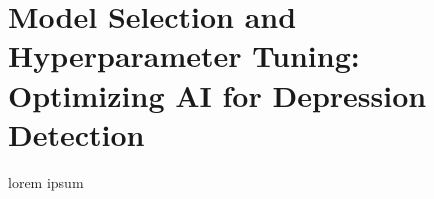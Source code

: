 \chapter{Model Selection and Hyperparameter Tuning: Optimizing AI for Depression Detection}
lorem ipsum
\label{chap:ch3}
